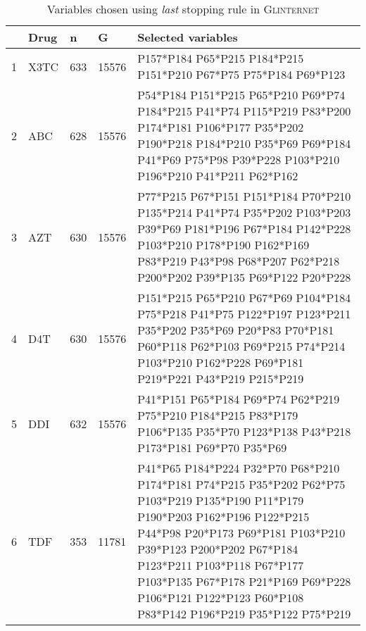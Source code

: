 \begin{table}[ht]
\centering
\begin{tabular}{rllll}
  \hline
 & Drug & n & G & Selected variables \\ 
  \hline
1 & X3TC & 633 & 15576 & P157*P184 P65*P215 P184*P215 P151*P210 P67*P75 P75*P184 P69*P123 \\ 
  2 & ABC & 628 & 15576 & P54*P184 P151*P215 P65*P210 P69*P74 P184*P215 P41*P74 P115*P219 P83*P200 P174*P181 P106*P177 P35*P202 P190*P218 P184*P210 P35*P69 P69*P184 P41*P69 P75*P98 P39*P228 P103*P210 P196*P210 P41*P211 P62*P162 \\ 
  3 & AZT & 630 & 15576 & P77*P215 P67*P151 P151*P184 P70*P210 P135*P214 P41*P74 P35*P202 P103*P203 P39*P69 P181*P196 P67*P184 P142*P228 P103*P210 P178*P190 P162*P169 P83*P219 P43*P98 P68*P207 P62*P218 P200*P202 P39*P135 P69*P122 P20*P228 \\ 
  4 & D4T & 630 & 15576 & P151*P215 P65*P210 P67*P69 P104*P184 P75*P218 P41*P75 P122*P197 P123*P211 P35*P202 P35*P69 P20*P83 P70*P181 P60*P118 P62*P103 P69*P215 P74*P214 P103*P210 P162*P228 P69*P181 P219*P221 P43*P219 P215*P219 \\ 
  5 & DDI & 632 & 15576 & P41*P151 P65*P184 P69*P74 P62*P219 P75*P210 P184*P215 P83*P179 P106*P135 P35*P70 P123*P138 P43*P218 P173*P181 P69*P70 P35*P69 \\ 
  6 & TDF & 353 & 11781 & P41*P65 P184*P224 P32*P70 P68*P210 P174*P181 P74*P215 P35*P202 P62*P75 P103*P219 P135*P190 P11*P179 P190*P203 P162*P196 P122*P215 P44*P98 P20*P173 P69*P181 P103*P210 P39*P123 P200*P202 P67*P184 P123*P211 P103*P118 P67*P177 P103*P135 P67*P178 P21*P169 P69*P228 P106*P121 P122*P123 P60*P108 P83*P142 P196*P219 P35*P122 P75*P219 \\ 
   \hline
\end{tabular}
\caption{Variables chosen using \textit{last} stopping rule in \textsc{Glinternet}} 
\end{table}

